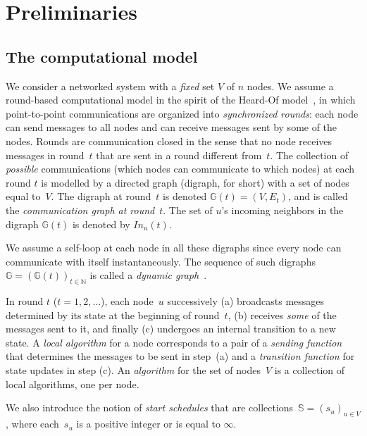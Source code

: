 \documentclass[11pt,letterpaper]{article}
\newcommand{\edmargin}[2]{\marginpar{\raggedright\linespread{.7}\footnotesize #1: #2}}
\begin{document}
\section{Preliminaries}\label{sec:model}
 
\subsection{The computational model}
	
We consider a networked system with a {\em fixed} set $V$ of $n$ nodes.
We assume a round-based computational model  in the spirit of the Heard-Of model~\cite{CBS09}, 
	in which point-to-point communications are organized into \emph{synchronized rounds}: 
	each node can send messages  to all nodes and can receive messages sent  by some of the nodes.
Rounds are communication closed in the sense that no node receives messages in round~$t$ that are sent 
	in a round different from~$t$. 
The collection of \emph{possible} communications (which nodes can communicate to which nodes) at each round $t$
	is modelled by a directed graph (digraph, for short) with a set of nodes equal to~$V$.
The digraph at round~$t$ is  denoted $\mathds{G}(t)=(V,E_t)$, and is called the \emph{communication graph at round}~$t$. 
The set of $u$'s incoming neighbors in the digraph $\mathds{G}(t)$ is denoted by $\mathit{In}_u(t)$.

We assume a self-loop at each node in all these digraphs  since every node can communicate with 
	itself instantaneously.	
The sequence of such digraphs~$\mathds{G}=\left (\mathds{G}(t) \right )_{t\in \mathds{N}}$ is called a {\em dynamic graph}~\cite{CFQS11:TVG}. 

In round $t$ ($t = 1, 2 , \ldots $), each node~$ u $ successively
	(a) broadcasts  messages determined by its state at the beginning of round~$t$,
	(b) receives \emph{some} of the messages sent to it,
	and finally (c) undergoes\edmargin{sm}{performs?} an internal transition to a new\edmargin{sm}{successor?} state.
A  \emph{local algorithm} for a node corresponds to a pair of
	a \emph{sending function} that determines the messages to be sent in step~(a)
	and a \emph{transition function} for state updates in step (c).
An \emph{algorithm} for the set of nodes~$V$ is a collection of local algorithms, one per node.

We also introduce the notion of  \emph{start schedules}
	that are collections~$\mathds{S}= \left (s_u \right )_{u \in V}$,
	where each~$s_u$ is  a positive integer or is equal to $\infty$.
\end{document}
